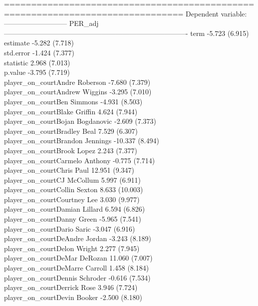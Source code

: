 \documentclass[
  landscape]{article}
\begin{document}
===============================================================================
Dependent variable:\\
--------------------------- PER\_adj\\
-------------------------------------------------------------------------------
term -5.723 (6.915)\\
estimate -5.282 (7.718)\\
std.error -1.424 (7.377)\\
statistic 2.968 (7.013)\\
p.value -3.795 (7.719)\\
player\_on\_courtAndre Roberson -7.680 (7.379)\\
player\_on\_courtAndrew Wiggins -3.295 (7.010)\\
player\_on\_courtBen Simmons -4.931 (8.503)\\
player\_on\_courtBlake Griffin 4.624 (7.944)\\
player\_on\_courtBojan Bogdanovic -2.609 (7.373)\\
player\_on\_courtBradley Beal 7.529 (6.307)\\
player\_on\_courtBrandon Jennings -10.337 (8.494)\\
player\_on\_courtBrook Lopez 2.243 (7.377)\\
player\_on\_courtCarmelo Anthony -0.775 (7.714)\\
player\_on\_courtChris Paul 12.951 (9.347)\\
player\_on\_courtCJ McCollum 5.997 (6.911)\\
player\_on\_courtCollin Sexton 8.633 (10.003)\\
player\_on\_courtCourtney Lee 3.030 (9.977)\\
player\_on\_courtDamian Lillard 6.594 (6.826)\\
player\_on\_courtDanny Green -5.965 (7.541)\\
player\_on\_courtDario Saric -3.047 (6.916)\\
player\_on\_courtDeAndre Jordan -3.243 (8.189)\\
player\_on\_courtDelon Wright 2.277 (7.945)\\
player\_on\_courtDeMar DeRozan 11.060 (7.007)\\
player\_on\_courtDeMarre Carroll 1.458 (8.184)\\
player\_on\_courtDennis Schroder -0.616 (7.534)\\
player\_on\_courtDerrick Rose 3.946 (7.724)\\
player\_on\_courtDevin Booker -2.500 (8.180)\\
\end{document}
